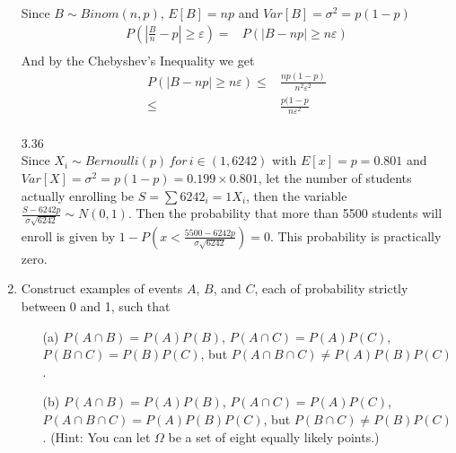 \documentclass[letterpaper,12pt]{article}
\theoremstyle{definition}
\begin{document}
\begin{enumerate}
Since $B \sim Binom(n, p)$, $E[B]=np$ and $Var[B]= \sigma^2 = p(1-p)$
\begin{align*}
P\left(|\frac{B}{n}-p| \geq \varepsilon \right) =& P \left( |B-np|  \geq n \varepsilon \right) \\
\end{align*}
And by the Chebyshev's Inequality we get
\begin{align*}
P \left( |B-np|  \geq n \varepsilon \right) \leq& \frac{np(1-p)}{n^2 \varepsilon^2} \\
\leq& \frac{p(1-p}{n \varepsilon^2}
\end{align*}\\

3.36\\
Since $X_i \sim Bernoulli(p)\, for \,  i \in (1, 6242)$ with $E[x]=p=0.801$ and $Var[X] = \sigma^2 =  p(1-p) = 0.199 \times 0.801$, let the number of students actually enrolling be $S = \sum 6242_i=1 X_i$, then the variable $\frac{S-6242p}{\sigma\sqrt{6242}} \sim N(0,1)$. Then the probability that more than 5500 students will enroll is given by $1-P(x < \frac{5500-6242p}{\sigma\sqrt{6242}}) = 0$. This probability is practically zero.
	\item Construct examples of events $A$, $B$, and $C$, each of probability strictly between 0 and 1, such that
   		\begin{itemize}
			\item[(a)] $P(A  \cap B) = P(A)P(B)$, $P(A  \cap C) = P(A)P(C)$, $P(B  \cap C) = P(B)P(C)$, but $P(A  \cap B \cap C) \neq P(A)P(B)P(C)$.
			\item[(b)] $P(A  \cap B) = P(A)P(B)$, $P(A  \cap C) = P(A)P(C)$, $P(A  \cap B \cap C) = P(A)P(B)P(C)$, but $P(B  \cap C) \neq P(B)P(C)$. (Hint: You can let $\Omega$ be a set of eight equally likely points.)
		\end{itemize}
		

\end{enumerate}
\end{document}
